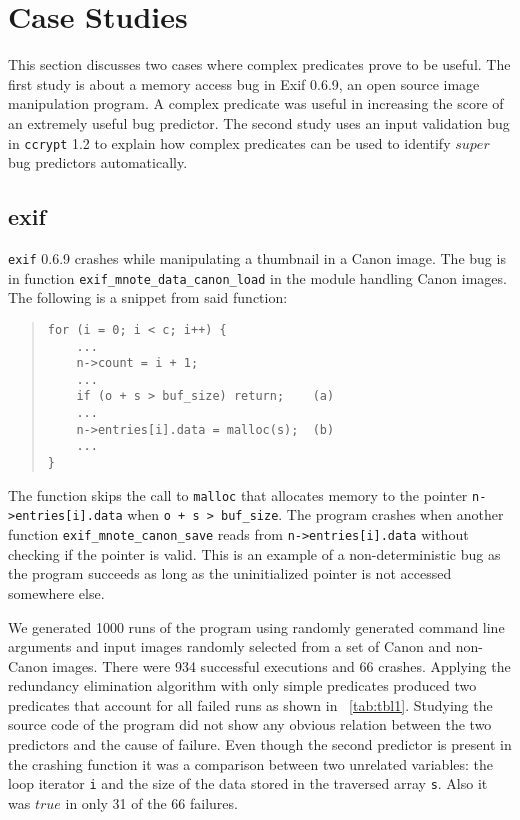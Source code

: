
\section{Case Studies}
\label{sec-qual}
This section discusses two cases where complex predicates prove to be useful.  The first study is about a memory access bug in Exif 0.6.9, an open source image manipulation program.  A complex predicate was useful in increasing the score of an extremely useful bug predictor.  The second study uses an input validation bug in \texttt{ccrypt} 1.2 to explain how complex predicates can be used to identify $super$ bug predictors automatically.

\subsection{exif}
\texttt{exif} 0.6.9 crashes while manipulating a thumbnail in a Canon image.  The bug is in function \texttt{exif\_mnote\_data\_canon\_load} in the module handling Canon images.  The following is a snippet from said function:
\begin{quote}
\begin{verbatim}
for (i = 0; i < c; i++) {
    ...
    n->count = i + 1;
    ...
    if (o + s > buf_size) return;    (a)
    ...
    n->entries[i].data = malloc(s);  (b)
    ...
}
\end{verbatim}
\end{quote}

The function skips the call to \texttt{malloc} that allocates memory to the pointer \texttt{n->entries[i].data} when \texttt{o + s > buf\_size}.  The program crashes when another function \texttt{exif\_\-mnote\_\-canon\_save} reads from \texttt{n->entries[i].data} without checking if the pointer is valid.  This is an example of a non-deterministic bug as the program succeeds as long as the uninitialized pointer is not accessed somewhere else.

We generated 1000 runs of the program using randomly generated command line arguments and input images randomly selected from a set of Canon and non-Canon images.  There were 934 successful executions and 66 crashes.  Applying the redundancy elimination algorithm with only simple predicates produced two predicates that account for all failed runs as shown in ~\autoref{tab:tbl1}.  Studying the source code of the program did not show any obvious relation between the two predictors and the cause of failure.  Even though the second predictor is present in the crashing function it was a comparison between two unrelated variables: the loop iterator \texttt{i} and the size of the data stored in the traversed array \texttt{s}.  Also it was $true$ in only 31 of the 66 failures.

